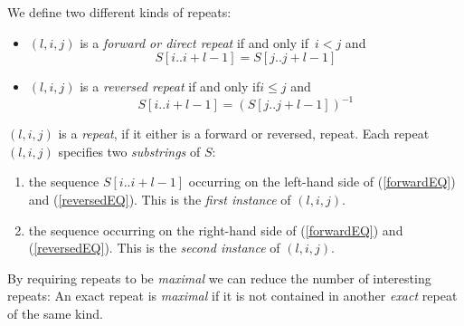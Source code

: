 \documentclass[12pt]{article}
\newcommand{\Iff}{if and only if\xspace}
\newcommand{\Substring}[3]{#1[#2..#3]}
\begin{document}
We define two different kinds of repeats:
\begin{itemize}
\item
\((l,i,j)\) is a \emph{forward or direct repeat} \Iff\ \(i<j\) and
\begin{equation}
\Substring{S}{i}{i+l-1}=\Substring{S}{j}{j+l-1}
\label{forwardEQ}
\end{equation}
\item
\((l,i,j)\) is a \emph{reversed repeat} \Iff \(i\leq j\) and
\begin{equation}
\Substring{S}{i}{i+l-1}=(\Substring{S}{j}{j+l-1})^{-1}
\label{reversedEQ}
\end{equation}
\end{itemize}
\((l,i,j)\) is a \emph{repeat}, if it either is a forward or reversed,
repeat. Each repeat \((l,i,j)\) specifies two \emph{substrings} of \(S\):
\begin{enumerate}
\item
the sequence \(\Substring{S}{i}{i+l-1}\) occurring on the left-hand
side of (\ref{forwardEQ}) and (\ref{reversedEQ}).
This is the \emph{first instance} of \((l,i,j)\).
\item
the sequence occurring on the right-hand
side of (\ref{forwardEQ}) and (\ref{reversedEQ}).
This is the \emph{second instance} of \((l,i,j)\).
\end{enumerate}

By requiring repeats to be \emph{maximal} we can reduce the number of
interesting repeats:
An exact repeat is \emph{maximal} if it is not contained in another
\emph{exact} repeat of the same kind.
\end{document}
